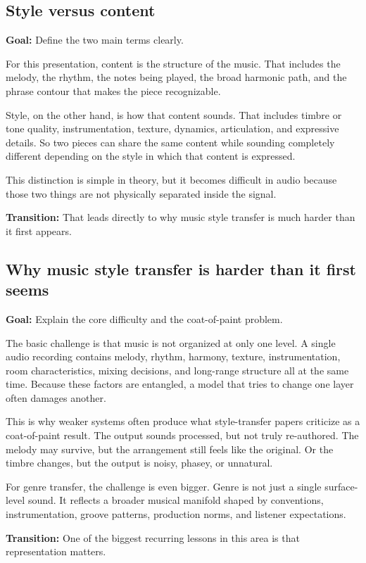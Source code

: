 \documentclass[11pt]{article}
\begin{document}
\subsection*{Style versus content}
\textbf{Goal:} Define the two main terms clearly.

For this presentation, content is the structure of the music. That includes the melody, the rhythm, the notes being played, the broad harmonic path, and the phrase contour that makes the piece recognizable.

Style, on the other hand, is how that content sounds. That includes timbre or tone quality, instrumentation, texture, dynamics, articulation, and expressive details. So two pieces can share the same content while sounding completely different depending on the style in which that content is expressed.

This distinction is simple in theory, but it becomes difficult in audio because those two things are not physically separated inside the signal.

\textbf{Transition:} That leads directly to why music style transfer is much harder than it first appears.

\subsection*{Why music style transfer is harder than it first seems}
\textbf{Goal:} Explain the core difficulty and the coat-of-paint problem.

The basic challenge is that music is not organized at only one level. A single audio recording contains melody, rhythm, harmony, texture, instrumentation, room characteristics, mixing decisions, and long-range structure all at the same time. Because these factors are entangled, a model that tries to change one layer often damages another.

This is why weaker systems often produce what style-transfer papers criticize as a coat-of-paint result. The output sounds processed, but not truly re-authored. The melody may survive, but the arrangement still feels like the original. Or the timbre changes, but the output is noisy, phasey, or unnatural.

For genre transfer, the challenge is even bigger. Genre is not just a single surface-level sound. It reflects a broader musical manifold shaped by conventions, instrumentation, groove patterns, production norms, and listener expectations.

\textbf{Transition:} One of the biggest recurring lessons in this area is that representation matters.
\end{document}

